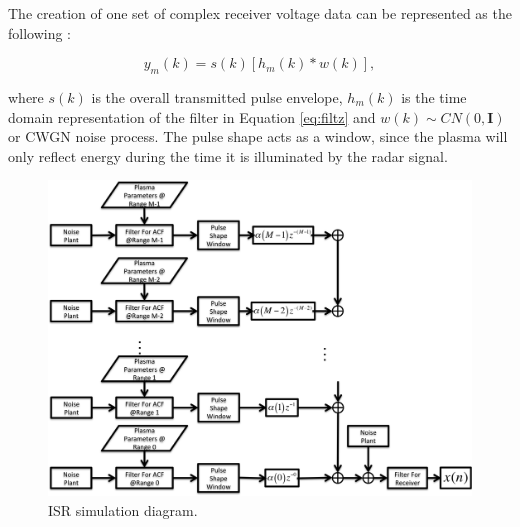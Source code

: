 \documentclass[draft,ras]{agutex}
\begin{document}
\begin{article}
The creation of one set of complex receiver voltage data can be represented as the following  :   

\begin{equation}
\label{eq2}
y_m (k)= s(k)\left[h_m(k)*w(k)\right],
\end{equation}
 
\noindent where $s(k)$ is the overall transmitted pulse envelope, $h_m(k)$ is the time domain representation of the filter in Equation \ref{eq:filtz} and $w(k)\sim CN(0,\mathbf{I})$ or CWGN noise process. The pulse shape acts as a window, since the plasma will only reflect energy during the time it is illuminated by the radar signal. 

%

\begin{figure}[!h]
\centering
\includegraphics[width=7.0in]{diagram}
\caption{ISR simulation diagram.}
\label{fig:isrdiag}
\end{figure}



\end{article}
\end{document}
